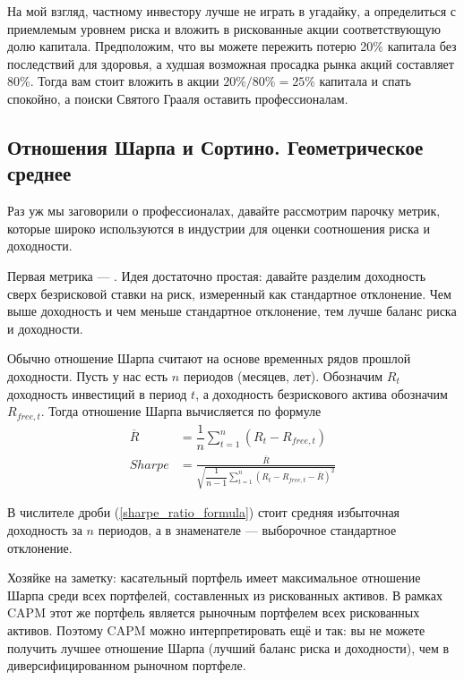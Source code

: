 На мой взгляд, частному инвестору лучше не играть в угадайку, а определиться с 
приемлемым уровнем риска и вложить в рискованные акции соответствующую долю 
капитала. Предположим, что вы можете пережить потерю 20\% капитала без 
последствий для здоровья, а худшая возможная просадка рынка акций составляет
80\%. Тогда вам стоит вложить в акции $20\%/80\% = 25\%$ капитала и спать 
спокойно, а поиски Святого Грааля оставить профессионалам.

\subsection{\sloppy Отношения Шарпа и Сортино. Геометрическое среднее}

Раз уж мы заговорили о профессионалах, давайте рассмотрим парочку метрик, 
которые широко используются в индустрии для оценки соотношения риска и 
доходности.

Первая метрика --- . Идея достаточно 
простая: давайте разделим доходность сверх безрисковой ставки на риск, 
измеренный как стандартное отклонение. Чем выше доходность и чем меньше 
стандартное отклонение, тем лучше баланс риска и доходности.

Обычно отношение Шарпа считают на основе временных рядов прошлой доходности. 
Пусть у нас есть $n$ периодов (месяцев, лет). Обозначим $R_t$ доходность 
инвестиций в период $t$, а доходность безрискового актива обозначим
$R_{free,t}$. Тогда отношение Шарпа вычисляется по формуле
\begin{align}
\nonumber
\overline{R} &= \dfrac{1}{n}\sum\limits_{t=1}^{n}(R_t - R_{free,t}) \\
Sharpe &= \frac
    {\overline{R}}
    {\sqrt{
        \dfrac{1}{n-1} 
        \sum\limits_{t=1}^{n}(R_t - R_{free,t} - \overline{R})^2
    }}
\label{sharpe_ratio_formula}
\end{align}

В числителе дроби (\ref{sharpe_ratio_formula}) стоит средняя избыточная 
доходность за $n$ периодов, а в знаменателе --- выборочное стандартное 
отклонение.

Хозяйке на заметку: касательный портфель имеет максимальное отношение Шарпа 
среди всех портфелей, составленных из рискованных активов. В рамках CAPM этот же 
портфель является рыночным портфелем всех рискованных активов. Поэтому CAPM 
можно интерпретировать ещё и так: вы не можете получить лучшее отношение Шарпа 
(лучший баланс риска и доходности), чем в диверсифицированном рыночном портфеле.

